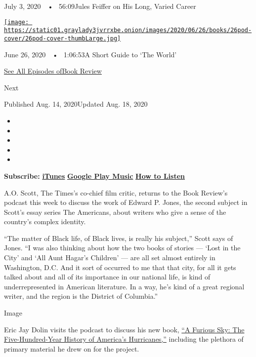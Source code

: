 July 3, 2020~~•~ 56:09Jules Feiffer on His Long, Varied Career

\href{https://www.nytimes3xbfgragh.onion/2020/06/26/books/review/podcast-richard-haass-world-brief-introduction.html?action=click\&module=audio-series-bar\&region=header\&pgtype=Article}{\texttt{[image: https://static01.graylady3jvrrxbe.onion/images/2020/06/26/books/26pod-cover/26pod-cover-thumbLarge.jpg]}}

June 26, 2020~~•~ 1:06:53A Short Guide to `The World'

\href{https://www.nytimes3xbfgragh.onion/column/book-review-podcast}{See
All Episodes ofBook Review}

Next

Published Aug. 14, 2020Updated Aug. 18, 2020

\begin{itemize}
\item
\item
\item
\item
\item
\end{itemize}

\textbf{Subscribe:}
\textbf{\href{https://itunes.apple.com/us/podcast/book-review/id120315179?mt=2}{iTunes}}
\textbf{\textbar{}}
\textbf{\href{https://play.google.com/music/listen?u=0\#/ps/Iv6zeb5qwjtzjfbyo3vy5zny5ky}{Google
Play Music}} \textbf{\textbar{}}
\textbf{\href{https://www.nytimes3xbfgragh.onion/2018/08/03/books/review/how-to-listen-to-the-book-review-podcast.html}{How
to Listen}}

A.O. Scott, The Times's co-chief film critic, returns to the Book
Review's podcast this week to discuss the work of Edward P. Jones, the
second subject in Scott's essay series The Americans, about writers who
give a sense of the country's complex identity.

``The matter of Black life, of Black lives, is really his subject,''
Scott says of Jones. ``I was also thinking about how the two books of
stories --- `Lost in the City' and `All Aunt Hagar's Children' --- are
all set almost entirely in Washington, D.C. And it sort of occurred to
me that that city, for all it gets talked about and all of its
importance in our national life, is kind of underrepresented in American
literature. In a way, he's kind of a great regional writer, and the
region is the District of Columbia.''

Image

Eric Jay Dolin visits the podcast to discuss his new book,
\href{https://www.nytimes3xbfgragh.onion/2020/08/04/books/review/a-furious-sky-hurricanes-eric-jay-dolan.html}{``A
Furious Sky: The Five-Hundred-Year History of America's Hurricanes,''}
including the plethora of primary material he drew on for the project.

